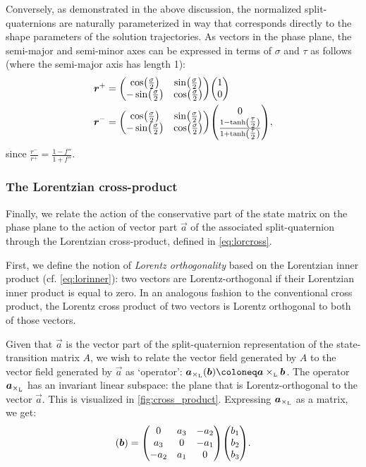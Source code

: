 Conversely, as demonstrated in the above discussion, the normalized split-quaternions are naturally parameterized in way that corresponds directly to the shape parameters of the solution trajectories. As vectors in the phase plane, the semi-major and semi-minor axes can be expressed in terms of \(\sigma\) and \(\tau\) as follows (where the semi-major axis has length 1):
\renewcommand{\arraystretch}{1.4}
\begin{equation}
    \begin{split}
        \vec{r}^+ &= \mqty(\cos(\tfrac{\sigma}{2}) & \sin(\tfrac{\sigma}{2}) \\ -\sin(\tfrac{\sigma}{2}) & \cos(\tfrac{\sigma}{2}))\mqty(1 \\ 0 ) \\
        \vec{r}^- &= \mqty(\cos(\tfrac{\sigma}{2}) & \sin(\tfrac{\sigma}{2}) \\ -\sin(\tfrac{\sigma}{2}) & \cos(\tfrac{\sigma}{2}))\mqty( 0 \\ \frac{1 - \tanh(\tfrac{\tau}{2})}{1 + \tanh(\tfrac{\tau}{2})}), \\
    \end{split}
    \label{eq:major_axes}
\end{equation}
\renewcommand{\arraystretch}{1}
since \(\displaystyle \frac{r^-}{r^+} = \frac{1 - f''}{1 + f''}\).

\subsubsection{The Lorentzian cross-product}
Finally, we relate the action of the conservative part of the state matrix on the phase plane to the action of vector part $\vec{a}$ of the associated split-quaternion through the Lorentzian cross-product, defined in \cref{eq:lorcross}. 

First, we define the notion of \emph{Lorentz orthogonality} based on the Lorentzian inner product (cf. \cref{eq:lorinner}): two vectors are Lorentz-orthogonal if their Lorentzian inner product is equal to zero. In an analogous fashion to the conventional cross product, the Lorentz cross product of two vectors is Lorentz orthogonal to both of those vectors.

Given that \(\vec{a}\) is the vector part of the split-quaternion representation of the state-transition matrix \(A\), we wish to relate the vector field generated by \(A\) to the vector field generated by \(\vec{a}\) as `operator': \(\vec{a}_{\lorcrossp{}{}}(\vec{b}) \coloneq \lorcrossp{\vec{a}}{\vec{b}}\). The operator \(\vec{a}_{\lorcrossp{}{}}\) has an invariant linear subspace: the plane that is Lorentz-orthogonal to the vector \(\vec{a}\). This is visualized in \cref{fig:cross_product}. Expressing \(\vec{a}_{\lorcrossp{}{}}\) as a matrix, we get:
\begin{equation}
    [\vec{a}_{\lorcrossp{}{}}](\vec{b}) = \mqty(0 & a_3 & -a_2 \\ a_3 & 0 & -a_1 \\ -a_2 & a_1 & 0) \mqty(b_1\\b_2\\b_3).
\end{equation}

